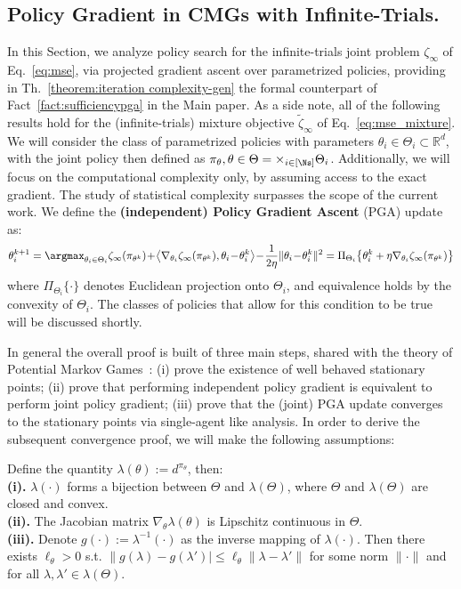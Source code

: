 \subsection{Policy Gradient in CMGs with Infinite-Trials.}
\label{apx:theory}
In this Section, we analyze policy search for the infinite-trials joint problem $\zeta_\infty$ of Eq.~\eqref{eq:mse}, via projected gradient ascent over parametrized policies, providing in Th.~\ref{theorem:iteration complexity-gen} the formal counterpart of Fact~\ref{fact:sufficiencypga} in the Main paper. As a side note, all of the following results hold for the (infinite-trials) mixture objective $\tilde \zeta_\infty$ of Eq.~\eqref{eq:mse_mixture}. We will consider the class of parametrized policies with parameters $\theta_i \in \Theta_i \subset \mathbb R^d$, with the joint policy then defined as $\pi_\theta, \theta \in \Theta = \times_{i \in [\Ns]} \Theta_i$. Additionally, we will focus on the computational complexity only, by assuming access to the exact gradient. The study of statistical complexity surpasses the scope of the current work. We define the \textbf{(independent) Policy Gradient Ascent} (PGA) update as:
\begin{eqnarray}
\label{defn:grad-proj}
\theta^{k+1}_i  =  \argmax_{\theta_i\in\Theta_i} \zeta_\infty(\pi_{\theta^k}) \!+\! \left\langle \nabla_{\theta_i} \zeta_\infty(\pi_{\theta^k}),\theta_i\!-\!\theta^k_i\right\rangle \!-\! \frac{1}{2\eta}\|\theta_i\!-\!\theta_i^k\|^2 =  \Pi_{\Theta_i}\big\{\theta^k_i + \eta\nabla_{\theta_i} \zeta_\infty(\pi_{\theta^k})\big\}
\end{eqnarray}
where $\Pi_{\Theta_i}\{\cdot\}$ denotes Euclidean projection onto $\Theta_i$, and equivalence holds by the convexity of $\Theta_i$. The classes of policies that allow for this condition to be true will be discussed shortly.

In general the overall proof is built of three main steps, shared with the theory of Potential Markov Games~\citep{leonardos2021globalconvergencemultiagentpolicy}: (i) prove the existence of well behaved stationary points; (ii) prove that performing independent policy gradient is equivalent to perform joint policy gradient; (iii) prove that the (joint) PGA update converges to the stationary points via single-agent like analysis.
In order to derive the subsequent convergence proof, we will make the following assumptions:

\begin{assumption}
	\label{assumption:gen-para} Define the quantity $\lambda(\theta) := d^{\pi_\theta}$, then:\\
	\textbf{(i).} $\lambda(\cdot)$ forms a bijection between $\Theta$ and $\lambda(\Theta)$, where $\Theta$ and $\lambda(\Theta)$ are closed and convex. \\
	\textbf{(ii).} The Jacobian matrix $\nabla_{\theta}\lambda(\theta)$ is Lipschitz continuous in $\Theta$.  \\
	\textbf{(iii).} Denote $g(\cdot) := \lambda^{-1}(\cdot)$ as the inverse mapping of $\lambda(\cdot)$. Then there exists $ \ell_{\theta}>0$ s.t. $\|g(\lambda)-g(\lambda')|\leq \ell_\theta\|\lambda-\lambda'\|$ for some norm $\|\cdot\|$ and for all $\lambda,\lambda'\in\lambda(\Theta)$. 
\end{assumption}

